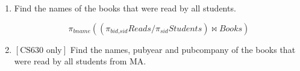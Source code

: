 \documentclass[letterpaper, 11pt]{article}
\begin{document}
\begin{enumerate}[label={\alph*}),leftmargin=*]
\begin{tcolorbox}
    \end{tcolorbox}
    \item Find the names of the books that were read by all students.
    \begin{tcolorbox}
    \[\pi_{\textit{bname}}((\pi_{\textit{bid,sid}}\textit{Reads} / \pi_{\textit{sid}}\textit{Students}) \bowtie \textit{Books})\]
    \end{tcolorbox}    
    \item $\left[\text{CS630 only}\right]$ Find the names, pubyear and pubcompany of the books that were read by all students from MA.
\end{enumerate}
\end{document}
